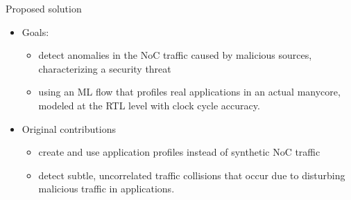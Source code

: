 \begin{frame}{Proposed solution}
    \begin{itemize}    
    
    \item Goals: \begin{itemize}
        \item detect anomalies in the NoC traffic caused by malicious sources, characterizing a security threat
        \item using an ML flow that profiles real applications in an actual manycore, modeled at the RTL level with clock cycle accuracy.
    \end{itemize}

    \item Original contributions \begin{itemize}
        \item create and use application profiles instead of synthetic NoC traffic

        \item detect subtle, uncorrelated traffic collisions that occur due to disturbing malicious traffic in applications.
    \end{itemize}
    
    \end{itemize}
\end{frame}
